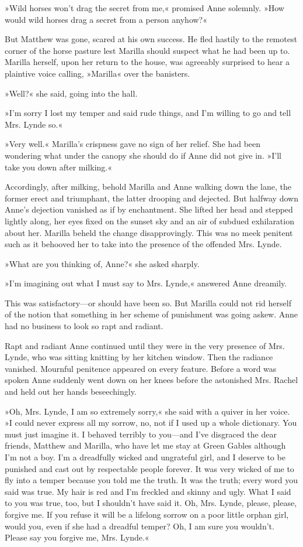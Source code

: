 »Wild horses won’t drag the secret from me,« promised Anne solemnly. »How would wild horses drag a secret from a person anyhow?«

But Matthew was gone, scared at his own success. He fled hastily to the remotest corner of the horse pasture lest Marilla should suspect what he had been up to. Marilla herself, upon her return to the house, was agreeably surprised to hear a plaintive voice calling, »Marilla« over the banisters.

»Well?« she said, going into the hall.

»I’m sorry I lost my temper and said rude things, and I’m willing to go and tell Mrs. Lynde so.«

»Very well.« Marilla’s crispness gave no sign of her relief. She had been wondering what under the canopy she should do if Anne did not give in. »I’ll take you down after milking.«

Accordingly, after milking, behold Marilla and Anne walking down the lane, the former erect and triumphant, the latter drooping and dejected. But halfway down Anne’s dejection vanished as if by enchantment. She lifted her head and stepped lightly along, her eyes fixed on the sunset sky and an air of subdued exhilaration about her. Marilla beheld the change disapprovingly. This was no meek penitent such as it behooved her to take into the presence of the offended Mrs. Lynde.

»What are you thinking of, Anne?« she asked sharply.

»I’m imagining out what I must say to Mrs. Lynde,« answered Anne dreamily.

This was satisfactory—or should have been so. But Marilla could not rid herself of the notion that something in her scheme of punishment was going askew. Anne had no business to look so rapt and radiant.

Rapt and radiant Anne continued until they were in the very presence of Mrs. Lynde, who was sitting knitting by her kitchen window. Then the radiance vanished. Mournful penitence appeared on every feature. Before a word was spoken Anne suddenly went down on her knees before the astonished Mrs. Rachel and held out her hands beseechingly.

»Oh, Mrs. Lynde, I am so extremely sorry,« she said with a quiver in her voice. »I could never express all my sorrow, no, not if I used up a whole dictionary. You must just imagine it. I behaved terribly to you—and I’ve disgraced the dear friends, Matthew and Marilla, who have let me stay at Green Gables although I’m not a boy. I’m a dreadfully wicked and ungrateful girl, and I deserve to be punished and cast out by respectable people forever. It was very wicked of me to fly into a temper because you told me the truth. It was the truth; every word you said was true. My hair is red and I’m freckled and skinny and ugly. What I said to you was true, too, but I shouldn’t have said it. Oh, Mrs. Lynde, please, please, forgive me. If you refuse it will be a lifelong sorrow on a poor little orphan girl, would you, even if she had a dreadful temper? Oh, I am sure you wouldn’t. Please say you forgive me, Mrs. Lynde.«

